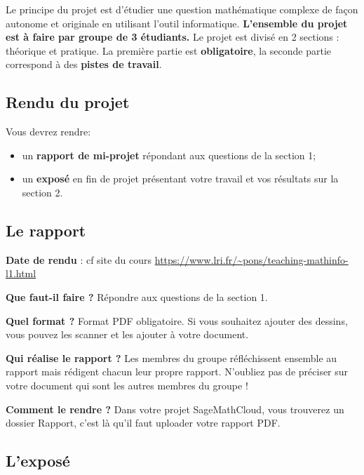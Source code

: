 Le principe du projet est d'étudier une question mathématique complexe de façon autonome et originale en utilisant l'outil informatique. \textbf{L'ensemble du projet est à faire par groupe de 3 étudiants.} Le projet est divisé en 2 sections : théorique et pratique. La première partie est \textbf{obligatoire}, la seconde partie correspond à des \textbf{pistes de travail}.

\subsection*{Rendu du projet}\strut

Vous devrez rendre:

\begin{itemize}

\item un \textbf{rapport de mi-projet} répondant aux questions de la section 1;

\item un \textbf{exposé} en fin de projet présentant votre travail et vos résultats sur la section 2.
\end{itemize}

\subsection*{Le rapport}\strut

\smallskip
\textbf{Date de rendu} : cf site du cours \url{https://www.lri.fr/~pons/teaching-mathinfo-l1.html}

\smallskip
\textbf{Que faut-il faire ?} Répondre aux questions de la section 1.

\smallskip
\textbf{Quel format ?} Format PDF obligatoire. Si vous souhaitez ajouter des dessins, vous pouvez les scanner et les ajouter à votre document.

\smallskip
\textbf{Qui réalise le rapport ?} Les membres du groupe réfléchissent ensemble au rapport mais rédigent chacun leur propre rapport. N'oubliez pas de préciser sur votre document qui sont les autres membres du groupe !

\smallskip
\textbf{Comment le rendre ?} Dans votre projet SageMathCloud, vous trouverez un dossier \og Rapport\fg, c'est là qu'il faut uploader votre rapport PDF.

\subsection*{L'exposé}\strut

